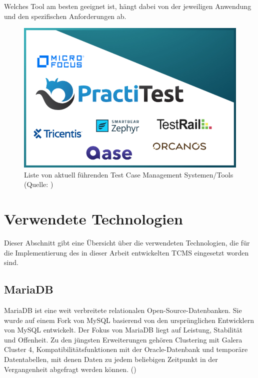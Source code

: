 \documentclass[a4paper, fontsize=11pt, parskip=half, twoside]{scrreprt}
\begin{document}
	Welches Tool am besten geeignet ist, hängt dabei von der jeweiligen Anwendung und den spezifischen Anforderungen ab.
	\newline
	\begin{figure}[ht]
		\centering
		\includegraphics[scale=0.5]{assets/best-tool-logos.jpg}
		\caption{Liste von aktuell führenden Test Case Management Systemen/Tools (Quelle: \textcite{noauthor_7_nodate})}
		\label{fig:tcms_logo}
	\end{figure}
	 
	
	\section{Verwendete Technologien} \label{sec:technologies}
	Dieser Abschnitt gibt eine Übersicht über die verwendeten Technologien, die für die Implementierung des in dieser Arbeit entwickelten \ac{TCMS} eingesetzt worden sind.
	
	\subsection{MariaDB}
	MariaDB ist eine weit verbreitete relationalen Open-Source-Datenbanken. 
	Sie wurde auf einem Fork von MySQL basierend von den ursprünglichen Entwicklern von MySQL entwickelt. 
	Der Fokus von MariaDB liegt auf Leistung, Stabilität und Offenheit. 
	Zu den jüngsten Erweiterungen gehören Clustering mit Galera Cluster 4, Kompatibilitätsfunktionen mit der Oracle-Datenbank und temporäre Datentabellen, mit denen Daten zu jedem beliebigen Zeitpunkt in der Vergangenheit abgefragt werden können. (\textcite{noauthor_mariadb_nodate})
	
\end{document}
